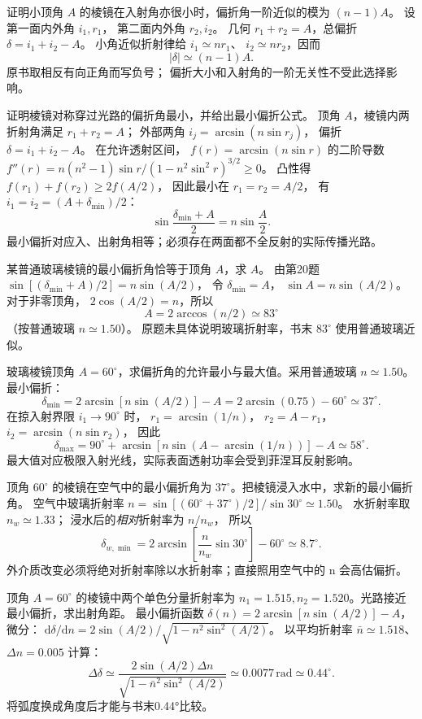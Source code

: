 证明小顶角 $A$ 的棱镜在入射角亦很小时，偏折角一阶近似的模为 $(n-1)A$。
\exsolution
设第一面内外角 $i_1,r_1$，
第二面内外角 $r_2,i_2$。
几何 $r_1+r_2=A$，总偏折
$\delta=i_1+i_2-A$。
小角近似折射律给
$i_1\simeq nr_1$、
$i_2\simeq nr_2$，因而
\[
\boxed{|\delta|\simeq(n-1)A}.
\]
\excheck 原书取相反有向正角而写负号；
偏折大小和入射角的一阶无关性不受此选择影响。

证明棱镜对称穿过光路的偏折角最小，并给出最小偏折公式。
\exsolution
顶角 $A$，棱镜内两折射角满足
$r_1+r_2=A$；
外部两角
$i_j=\arcsin(n\sin r_j)$，
偏折 $\delta=i_1+i_2-A$。
在允许透射区间，
$f(r)=\arcsin(n\sin r)$ 的二阶导数
$f''(r)=n(n^2-1)\sin r/
(1-n^2\sin^2r)^{3/2}\ge0$。
凸性得
$f(r_1)+f(r_2)\ge2f(A/2)$，
因此最小在 $r_1=r_2=A/2$，
有 $i_1=i_2=(A+\delta_{\min})/2$：
\[
\boxed{\sin\frac{\delta_{\min}+A}{2}
=n\sin\frac A2}.
\]
\excheck 最小偏折对应入、出射角相等；必须存在两面都不全反射的实际传播光路。

某普通玻璃棱镜的最小偏折角恰等于顶角 $A$，求 $A$。
\exsolution
由第20题
$\sin[(\delta_{\min}+A)/2]=n\sin(A/2)$，
令 $\delta_{\min}=A$，
$\sin A=n\sin(A/2)$。
对于非零顶角，
$2\cos(A/2)=n$，所以
\[
\boxed{A=2\arccos(n/2)\simeq83^\circ}
\]
（按普通玻璃 $n\simeq1.50$）。
\excheck 原题未具体说明玻璃折射率，书末 $83^\circ$ 使用普通玻璃近似。

玻璃棱镜顶角 $A=60^\circ$，求偏折角的允许最小与最大值。采用普通玻璃 $n\simeq1.50$。
\exsolution
最小偏折：
\[
\delta_{\min}=2\arcsin[n\sin(A/2)]-A
=2\arcsin(0.75)-60^\circ\simeq37^\circ.
\]
在掠入射界限 $i_1\to90^\circ$ 时，
$r_1=\arcsin(1/n)$，
$r_2=A-r_1$，
$i_2=\arcsin(n\sin r_2)$，
因此
\[
\boxed{\delta_{\max}
=90^\circ+\arcsin[n\sin(A-\arcsin(1/n))]-A
\simeq58^\circ}.
\]
\excheck 最大值对应极限入射光线，实际表面透射功率会受到菲涅耳反射影响。

顶角 $60^\circ$ 的棱镜在空气中的最小偏折角为 $37^\circ$。把棱镜浸入水中，求新的最小偏折角。
\exsolution
空气中玻璃折射率
$n=\sin[(60^\circ+37^\circ)/2]/\sin30^\circ
\simeq1.50$。
水折射率取 $n_w\simeq1.33$；
浸水后的\emph{相对}折射率为 $n/n_w$，
所以
\[
\boxed{\delta_{w,\min}
=2\arcsin\left[\frac n{n_w}\sin30^\circ\right]
-60^\circ\simeq8.7^\circ}.
\]
\excheck 外介质改变必须将绝对折射率除以水折射率；直接照用空气中的 n 会高估偏折。

顶角 $A=60^\circ$ 的棱镜中两个单色分量折射率为 $n_1=1.515,n_2=1.520$。光路接近最小偏折，求出射角距。
\exsolution
最小偏折函数
$\delta(n)=2\arcsin[n\sin(A/2)]-A$，
微分：
$\mathrm d\delta/\mathrm dn=
2\sin(A/2)/\sqrt{1-n^2\sin^2(A/2)}$。
以平均折射率 $\bar n\simeq1.518$、
$\Delta n=0.005$ 计算：
\[
\boxed{\Delta\delta\simeq
\frac{2\sin(A/2)\Delta n}
{\sqrt{1-\bar n^2\sin^2(A/2)}}
\simeq0.0077\,\mathrm{rad}\simeq0.44^\circ}.
\]
\excheck 将弧度换成角度后才能与书末0.44°比较。

